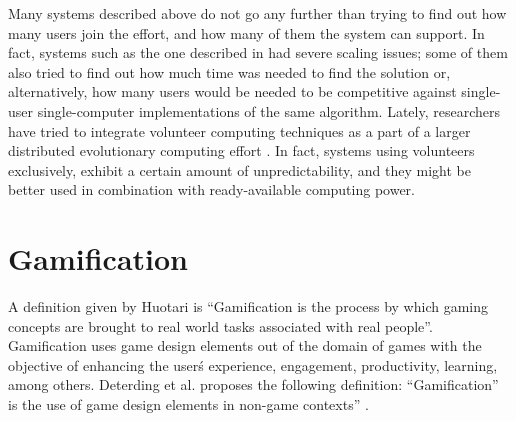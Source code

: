 \documentclass{llncs}
\begin{document}

Many systems described above do not go any further than trying to find out how many users join the effort, and how many of them the system can support. In fact, systems such as the one described in
\cite{gecco07:workshop:dcor} had severe scaling issues; some of them
also tried to find out how much time was needed to find the solution
or, alternatively, how many users would be needed to be competitive
against single-user single-computer implementations of the same
algorithm. Lately, researchers have tried to integrate volunteer
computing techniques as a part of a larger distributed evolutionary computing
effort \cite{leclerc2016seamless}.  In fact, systems using volunteers
exclusively, exhibit a certain amount of unpredictability, and they
might be better used in combination with ready-available computing
power.

\section{Gamification}
\label{sec:gamification}
A definition given by Huotari \cite{huotari2012defining} is ``Gamification is
the process by which gaming concepts are brought to real world tasks associated with
real people''. Gamification uses game design elements out of the domain of games
with the objective of enhancing the user\'s experience, engagement, productivity,
learning, among others. Deterding et al. proposes the following definition:
 ``Gamification” is the use of game design elements in non-game contexts''
 \cite{deterding2011gamification}.
\end{document}
